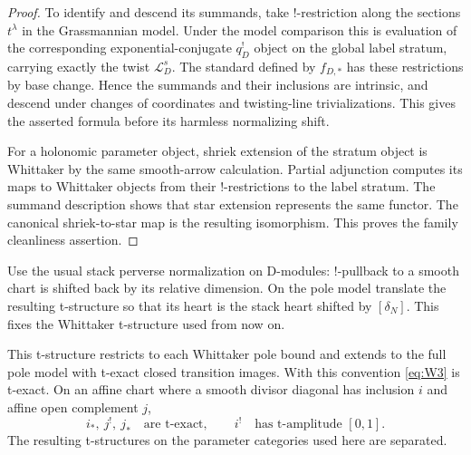 \begin{proof}
To identify and descend its summands, take $!$-restriction along the
sections $t^\lambda$ in the Grassmannian model. Under the model comparison
this is evaluation of the corresponding exponential-conjugate $q_D^!$
object on the global label stratum, carrying exactly the twist
$\mathcal L_D^s$. The standard defined by $f_{D,*}$ has these restrictions
by base change. Hence the summands and their inclusions are intrinsic,
and descend under changes of coordinates and twisting-line
trivializations. This gives the asserted formula before its harmless
normalizing shift.

For a holonomic parameter object, shriek extension of the stratum object
is Whittaker by the same smooth-arrow calculation. Partial adjunction
computes its maps to Whittaker objects from their $!$-restrictions to the
label stratum. The summand description shows that star extension
represents the same functor. The canonical shriek-to-star map is the
resulting isomorphism. This proves the family cleanliness assertion.
\end{proof}

Use the usual stack perverse normalization on D-modules: $!$-pullback to
a smooth chart is shifted back by its relative dimension. On the pole
model translate the resulting t-structure so that its heart is the stack
heart shifted by $[\delta_N]$. This fixes the Whittaker t-structure used
from now on.

\begin{proposition}
\label{whittaker:t-structure}
This t-structure restricts to each Whittaker pole bound and extends to the
full pole model with t-exact closed transition images. With this
convention \eqref{eq:W3} is t-exact. On an affine chart where a smooth
divisor diagonal has inclusion $i$ and affine open complement $j$,
\[
 i_*,\ j^!,\ j_*\quad\text{are t-exact},
 \qquad i^!\quad\text{has t-amplitude }[0,1].
\]
The resulting t-structures on the parameter categories used here are
separated.
\end{proposition}

